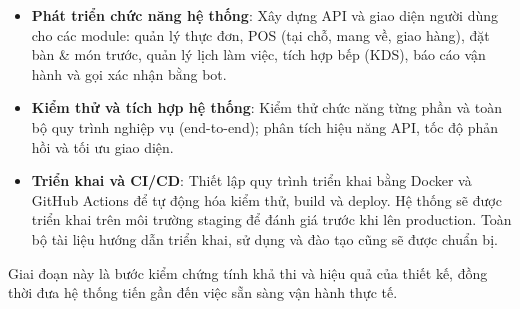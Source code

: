 \begin{itemize}
    \item \textbf{Phát triển chức năng hệ thống}: Xây dựng API và giao diện người dùng cho các module: quản lý thực đơn, POS (tại chỗ, mang về, giao hàng), đặt bàn & món trước, quản lý lịch làm việc, tích hợp bếp (KDS), báo cáo vận hành và gọi xác nhận bằng bot.
    
    \item \textbf{Kiểm thử và tích hợp hệ thống}: Kiểm thử chức năng từng phần và toàn bộ quy trình nghiệp vụ (end-to-end); phân tích hiệu năng API, tốc độ phản hồi và tối ưu giao diện.

    \item \textbf{Triển khai và CI/CD}: Thiết lập quy trình triển khai bằng Docker và GitHub Actions để tự động hóa kiểm thử, build và deploy. Hệ thống sẽ được triển khai trên môi trường staging để đánh giá trước khi lên production. Toàn bộ tài liệu hướng dẫn triển khai, sử dụng và đào tạo cũng sẽ được chuẩn bị.
\end{itemize}

Giai đoạn này là bước kiểm chứng tính khả thi và hiệu quả của thiết kế, đồng thời đưa hệ thống tiến gần đến việc sẵn sàng vận hành thực tế.
